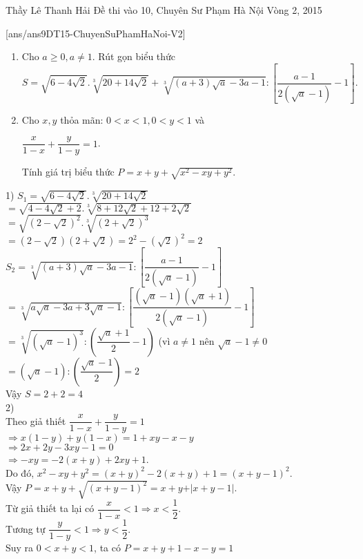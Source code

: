 \begin{name}
{Thầy  Lê Thanh Hải}
{Đề thi vào 10, Chuyên Sư Phạm Hà Nội Vòng 2, 2015}
\end{name}
\setcounter{ex}{0}
[ans/ans9DT15-ChuyenSuPhamHaNoi-V2]
\begin{ex}%
\hfill

	\begin{enumerate}
		\item Cho $a\geq 0,a\neq 1$. Rút gọn biểu thức\\
		$$S=\sqrt{6-4\sqrt{2}}.\sqrt[3]{20+14\sqrt{2}}+\sqrt[3]{(a+3)\sqrt{a}-3a-1}:\left[ \dfrac{a-1}{2(\sqrt{a}-1)}-1\right].$$
		\item Cho $x,y$ thỏa mãn: $0<x<1,0<y<1$ và
		\begin{center}
			$\dfrac{x}{1-x}+\dfrac{y}{1-y}=1$.
		\end{center}
		Tính giá trị biểu thức $P=x+y+\sqrt{x^2-xy+y^2}$.
	\end{enumerate}
	\loigiai
	{
		1) 
		$S_1=\sqrt{6-4\sqrt{2}}.\sqrt[3]{20+14\sqrt{2}}$ \\
		$   =\sqrt{4-4\sqrt{2}+2}.\sqrt[3]{8+12\sqrt{2}+12+2\sqrt{2}}$\\
		$   =\sqrt{(2-\sqrt{2})^2}.\sqrt[3]{(2+\sqrt{2})^3}$\\
		$   =(2-\sqrt{2})(2+\sqrt{2})=2^2-(\sqrt{2})^2=2$\\
		$S_2=\sqrt[3]{(a+3)\sqrt{a}-3a-1}:\left[ \dfrac{a-1}{2(\sqrt{a}-1)}-1\right] $\\
		$   =\sqrt[3]{a\sqrt{a}-3a+3\sqrt{a}-1}:\left[ \dfrac{(\sqrt{a}-1)(\sqrt{a}+1)}{2(\sqrt{a}-1)}-1\right] $\\
		$   =\sqrt[3]{(\sqrt{a}-1)^3}:\left( \dfrac{\sqrt{a}+1}{2}-1\right) $ (vì $a\neq 1$ nên $\sqrt{a}-1\neq 0$ \\
		$   =(\sqrt{a}-1):\left( \dfrac{\sqrt{a}-1}{2}\right)=2 $\\
		Vậy $S=2+2=4$\\
		2)\\
		Theo giả thiết $\dfrac{x}{1-x}+\dfrac{y}{1-y}=1$\\
		$\Rightarrow x(1-y)+y(1-x)=1+xy-x-y$\\
		$\Rightarrow 2x+2y-3xy-1=0$\\
		$\Rightarrow -xy=-2(x+y)+2xy+1$.\\
		Do đó, $x^2-xy+y^2=(x+y)^2-2(x+y)+1=(x+y-1)^2$.\\
		Vậy $P=x+y+\sqrt{(x+y-1)^2}=x+y+\vert x+y-1\vert$.\\
		Từ giả thiết ta lại có $\dfrac{x}{1-x}<1\Rightarrow x<\dfrac{1}{2}$.\\
		Tương tự $\dfrac{y}{1-y}<1\Rightarrow y<\dfrac{1}{2}$.\\
		Suy ra $0<x+y<1$, ta có $P=x+y+1-x-y=1$
	}
\end{ex}
